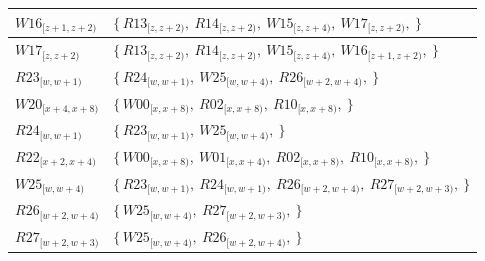 \begin{table}[htbp]
{\begin{tabular}{|l||l|}
      \\
      \hline
      $W16_{[z+1,z+2)}$ & $\{\,
      R13_{[z,z+2)},\ R14_{[z,z+2)},\ W15_{[z,z+4)},\ W17_{[z,z+2)},\ \}$ \\
      \hline
      $W17_{[z,z+2)}$ & $\{\,
      R13_{[z,z+2)},\ R14_{[z,z+2)},\ W15_{[z,z+4)},\ W16_{[z+1,z+2)},\ \}$ \\
      \hline
      \hline
      $R23_{[w,w+1)}$ & $\{\,
      R24_{[w,w+1)},\ W25_{[w,w+4)},\ R26_{[w+2,w+4)},\ \}$ \\
      \hline
      $W20_{[x+4,x+8)}$ & $\{\,
      W00_{[x,x+8)},\ R02_{[x,x+8)},\ R10_{[x,x+8)},\ \}$
      \\
      \hline
      $R24_{[w,w+1)}$ & $\{\,
      R23_{[w,w+1)},\ W25_{[w,w+4)},\ \}$ \\
      \hline
      $R22_{[x+2,x+4)}$ & $\{\,
      W00_{[x,x+8)},\ W01_{[x,x+4)},\ R02_{[x,x+8)},\ R10_{[x,x+8)},\ \}$
      \\
      \hline
      $W25_{[w,w+4)}$ & $\{\,
      R23_{[w,w+1)},\ R24_{[w,w+1)},\ R26_{[w+2,w+4)},\ R27_{[w+2,w+3)},\ \}$ \\
      \hline
      $R26_{[w+2,w+4)}$ & $\{\,
      W25_{[w,w+4)},\ R27_{[w+2,w+3)},\ \}$ \\
      \hline
      $R27_{[w+2,w+3)}$ & $\{\,
      W25_{[w,w+4)},\ R26_{[w+2,w+4)},\ \}$ \\
      \hline
    \end{tabular}%
  }
  \label{tab:dep-list}
\end{table}

